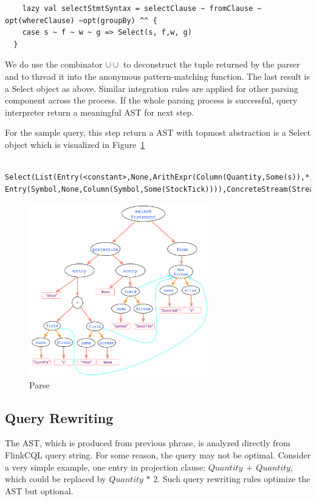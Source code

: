 \begin{itemize}
\begin{lstlisting}
	lazy val selectStmtSyntax = selectClause ~ fromClause ~ opt(whereClause) ~opt(groupBy) ^^ {
    case s ~ f ~ w ~ g => Select(s, f,w, g)
  }
\end{lstlisting}

We do use the combinator $\cup \cup$ to deconstruct the tuple returned by the parser and to thread it into the anonymous pattern-matching function. The last result is a Select object as above. Similar integration rules are applied for other parsing component across the process. 
If the whole parsing process is successful, query interpreter return a meaningful AST for next step. 

For the sample query, this step return a AST with topmost abstraction is a Select object which is visualized in Figure~\ref{fig:Parse}

\begin{lstlisting}	Select(List(Entry(<constant>,None,ArithExpr(Column(Quantity,Some(s)),*,Column(Price,None))), Entry(Symbol,None,Column(Symbol,Some(StockTick)))),ConcreteStream(Stream(StockTick,Some(s),false),None,None),None,None)
\end{lstlisting}
 



\end{itemize}


\begin{figure}[h!] 
\centering    
\includegraphics[width=0.7\textwidth]{Parse}
\caption{Parse}
\label{fig:Parse}
\end{figure}


\subsection{Query Rewriting}
The AST, which is produced from previous phrase, is analyzed directly from FlinkCQL query string. For some reason, the query may not be optimal. Consider a very simple example, one entry in projection clause: $Quantity\, +\, Quantity$, which could be replaced by $Quantity\, *\, 2$. Such query rewriting rules optimize the AST but optional. 

